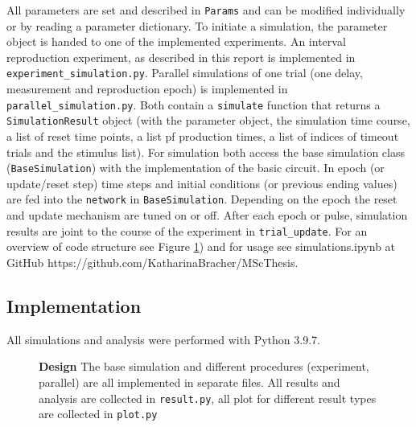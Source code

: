\documentclass[10pt]{article}
\begin{document}
All parameters are set and described in \texttt{Params} and can be modified individually or by reading a parameter dictionary. %
To initiate a simulation, the parameter object is handed to one of the implemented experiments. 
An interval reproduction experiment, as described in this report is implemented in \texttt{experiment\_simulation.py}. 
Parallel simulations of one trial (one delay, measurement and reproduction epoch) is implemented in \texttt{parallel\_simulation.py}.
Both contain a \texttt{simulate} function that returns a \texttt{SimulationResult} object (with the parameter object, the simulation time course, a list of reset time points, a list pf production times, a list of indices of timeout trials and the stimulus list).
For simulation both access the base simulation class (\texttt{BaseSimulation}) with the implementation of the basic circuit.
In epoch (or update/reset step) time steps and initial conditions (or previous ending values) are fed into the \texttt{network} in \texttt{BaseSimulation}. Depending on the epoch the reset and update mechanism are tuned on or off. 
After each epoch or pulse, simulation results are joint to the course of the experiment in \texttt{trial\_update}.
For an overview of code structure see Figure \ref{fig:code}) and for usage see simulations.ipynb at GitHub https://github.com/KatharinaBracher/MScThesis. 

\subsection{Implementation}
All simulations and analysis were performed with Python 3.9.7. 


\begin{figure}[ht]
	\vspace*{-2.5cm}
	\caption{\textbf{Design} The base simulation and different procedures (experiment, parallel) are all implemented in separate files. All results and analysis are collected in \texttt{result.py}, all plot for different result types are collected in \texttt{plot.py}}
\label{fig:code}
\end{figure}

\clearpage

\printbibliography
\end{document}
